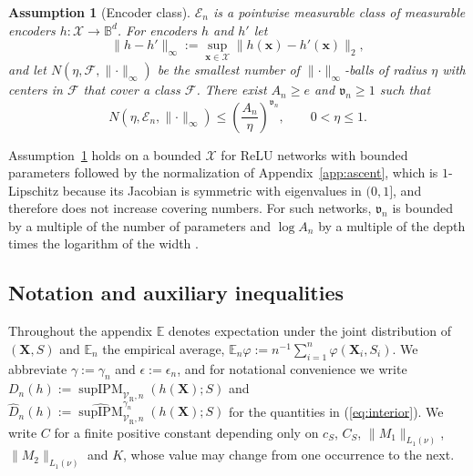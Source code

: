 \documentclass{article} %
\newtheorem{assumption}{Assumption}
\begin{document}
\begin{assumption}[Encoder class]
\label{as:encoder}
$\mathcal{E}_n$ is a pointwise measurable class \citep[Example~2.3.4]{vaart1997weak} of measurable encoders $h:\mathcal{X}\to\mathbb{B}^d$.  For encoders $h$ and $h'$ let
\begin{equation}
  \lVert h-h'\rVert_\infty:=\sup_{\mathbf{x}\in\mathcal{X}}\lVert h(\mathbf{x})-h'(\mathbf{x})\rVert_2 ,
  \label{eq:encoder-sup-norm}
\end{equation}
and let $N(\eta,\mathcal{F},\lVert\cdot\rVert_\infty)$ be the smallest number of $\lVert\cdot\rVert_\infty$-balls of radius $\eta$ with centers in $\mathcal{F}$ that cover a class $\mathcal{F}$.  There exist $A_n\ge e$ and $\mathfrak{v}_n\ge1$ such that
\begin{equation}
  N(\eta,\mathcal{E}_n,\lVert\cdot\rVert_\infty)
  \le\left(\frac{A_n}{\eta}\right)^{\mathfrak{v}_n},
  \qquad 0<\eta\le1 .
  \label{eq:encoder-entropy}
\end{equation}
\end{assumption}

Assumption~\ref{as:encoder} holds on a bounded $\mathcal{X}$ for ReLU networks with bounded parameters followed by the normalization of Appendix~\ref{app:ascent}, which is $1$-Lipschitz because its Jacobian is symmetric with eigenvalues in $(0,1]$, and therefore does not increase covering numbers.  For such networks, $\mathfrak{v}_n$ is bounded by a multiple of the number of parameters and $\log A_n$ by a multiple of the depth times the logarithm of the width \citep{schmidt2020nonparametric}.

\subsection{Notation and auxiliary inequalities}
\label{app:notation}

Throughout the appendix $\mathbb{E}$ denotes expectation under the joint distribution of $(\mathbf{X},S)$ and $\mathbb{E}_n$ the empirical average, $\mathbb{E}_n\varphi:=n^{-1}\sum_{i=1}^n\varphi(\mathbf{X}_i,S_i)$.  We abbreviate $\gamma:=\gamma_n$ and $\epsilon:=\epsilon_n$, and for notational convenience we write $D_n(h):=\operatorname{supIPM}_{\mathcal{V}_{\mathrm{R}},n}(h(\mathbf{X});S)$ and $\widehat{D}_n(h):=\widehat{\operatorname{supIPM}}^{\gamma_n}_{\mathcal{V}_{\mathrm{R}},n}(h(\mathbf{X});S)$ for the quantities in (\ref{eq:interior}).  We write $C$ for a finite positive constant depending only on $c_S$, $C_S$, $\lVert M_1\rVert_{L_1(\nu)}$, $\lVert M_2\rVert_{L_1(\nu)}$ and $K$, whose value may change from one occurrence to the next. 
\end{document}
